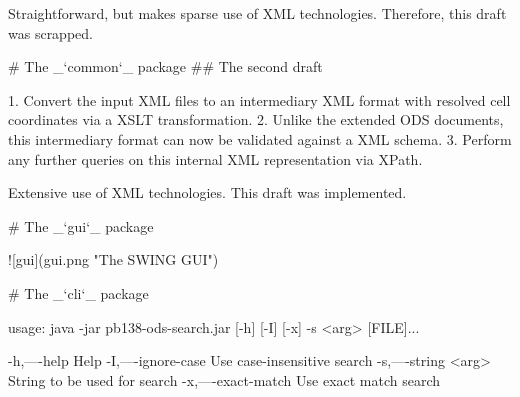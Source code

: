 \documentclass{beamer}
\let\acro\MakeUppercase
\begin{document}
\begin{markdown*}
\begin{darkframes}
\begin{frame}
Straightforward, but makes sparse use of \acro{xml} technologies. Therefore,
this draft was scrapped.

\end{frame}
\begin{frame}

# The _`common`_ package
## The second draft

 1. Convert the input \acro{xml} files to an intermediary \acro{xml} format
    with resolved cell coordinates via a \acro{xslt} transformation.
 2. Unlike the extended \acro{ods} documents, this intermediary format can
    now be validated against a \acro{xml} schema.
 3. Perform any further queries on this internal \acro{xml} representation
    via XPath.

Extensive use of \acro{xml} technologies. This draft was implemented.

\end{frame}
\begin{frame}

# The _`gui`_ package

\vspace{-1em}

 ![gui](gui.png "The \acro{swing} \acro{gui}")

\end{frame}
\begin{frame}

# The _`cli`_ package

    usage: java -jar pb138-ods-search.jar
                [-h] [-I] [-x] -s <arg> [FILE]...

       -h,----help             Help
       -I,----ignore-case      Use case-insensitive search
       -s,----string <arg>     String to be used for search
       -x,----exact-match      Use exact match search

\end{frame}
\end{darkframes}
\end{markdown*}
\end{document}
